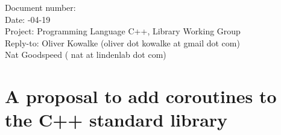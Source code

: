 \documentclass[a4paper,10pt,DIV15]{scrartcl}
\begin{document}
\small
\begin{tabbing}
    Document number: \=  \\
    Date:            -04-19 \\
    Project:         \> Programming Language C++, Library Working Group \\
    Reply-to:        \> Oliver Kowalke (oliver dot kowalke at gmail dot com)\\
                     \> Nat Goodspeed ( nat at lindenlab dot com)\\
\end{tabbing}

\section*{A proposal to add coroutines to the C++ standard library}


\tableofcontents














\end{document}
